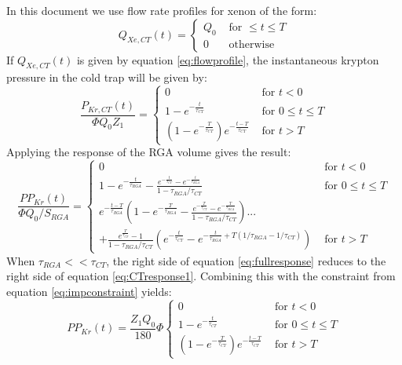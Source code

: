In this document we use flow rate profiles for xenon of the form:
\begin{equation}
\label{eq:flowprofile}
Q_{Xe,CT}(t) =
  \begin{cases}
    Q_0&\textrm{ for } \leq t\leq T\\
    0     &\textrm{ otherwise}
  \end{cases}
\end{equation}
If $Q_{Xe,CT}(t)$ is given by equation \ref{eq:flowprofile}, the instantaneous krypton pressure in the cold trap will be given by: 
\begin{equation}
\label{eq:CTresponse1}
\frac{P_{Kr,CT}(t)}{\Phi Q_0Z_1}=
\begin{cases}
0 & \textrm{ for } t<0\\
1-e^{-\frac{t}{\tau_{CT}}} & \textrm{ for } 0\leq t \leq T\\
(1-e^{-\frac{T}{\tau_{CT}}})e^{-\frac{t-T}{\tau_{CT}}}& \textrm{ for }  t > T
\end{cases}
\end{equation} 
Applying the response of the RGA volume gives the result:
\begin{equation}
\label{eq:fullresponse}
\frac{PP_{Kr}(t)}{\Phi Q_0 /S_{RGA}}=
\begin{cases}
0 & \textrm{ for } t<0\\
1-e^{-\frac{t}{\tau_{RGA}}}-\frac{e^{-\frac{t}{\tau_{CT}}}-e^{-\frac{t}{\tau_{RGA}}}}{1-\tau_{RGA}/\tau_{CT}} & \textrm{ for } 0\leq t \leq T\\
e^{-\frac{t-T}{\tau_{RGA}}}(1-e^{-\frac{T}{\tau_{RGA}}}-\frac{e^{-\frac{T}{\tau_{CT}}}-e^{-\frac{T}{\tau_{RGA}}}}{1-\tau_{RGA}/\tau_{CT}} ) ...\\
 +\frac{e^{\frac{T}{\tau_{CT}}}-1}{1-\tau_{RGA}/\tau_{CT}}(e^{-\frac{t}{\tau_{CT}}}-e^{-\frac{t}{\tau_{RGA}}+T(1/\tau_{RGA}-1/\tau_{CT})}) & \textrm{ for }  t > T
\end{cases}
\end{equation} 
When $\tau_{RGA}<<\tau_{CT}$, the right side of equation \ref{eq:fullresponse} reduces to the right side of equation \ref{eq:CTresponse1}. Combining this with the constraint from equation \ref{eq:impconstraint} yields:
\begin{equation}
\label{eq:CTresponse}
PP_{Kr}(t)=\frac{Z_1 Q_0}{180}\Phi
\begin{cases}
0 & \textrm{ for } t<0\\
1-e^{-\frac{t}{\tau_{CT}}} & \textrm{ for } 0\leq t \leq T\\
(1-e^{-\frac{T}{\tau_{CT}}})e^{-\frac{t-T}{\tau_{CT}}}& \textrm{ for }  t > T
\end{cases}
\end{equation} 

